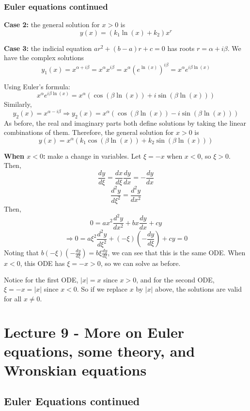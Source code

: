 \documentclass[11pt]{article}
\newcommand{\fdx}{\frac{dy}{dx}} %
\newcommand{\sdx}{\frac{d^2y}{dx^2}}
\begin{document}
\subsubsection{Euler equations continued}
	\textbf{Case 2:} the general solution for $x > 0$ is
		$$ y(x) = (k_1 \ln(x) + k_2) x^r $$

	\textbf{Case 3:} the indicial equation $ar^2 + (b-a) r + c = 0$ has roots $r = \alpha + i \beta$. We have the complex solutions
		$$ y_1 (x) = x^{\alpha + i \beta} = x^{\alpha} x^{i \beta} = x^{\alpha}(e^{\ln(x)})^{i \beta} = x^{\alpha}e^{i \beta \ln(x)} $$

	Using Euler's formula:
		$$ x^{\alpha} e^{i \beta \ln(x)} = x^{\alpha} (\cos(\beta \ln(x)) + i \sin(\beta \ln(x))) $$
	Similarly,
		$$ y_2 (x) = x^{\alpha - i \beta} \Rightarrow y_2 (x) = x^{\alpha} (\cos(\beta \ln(x)) - i \sin(\beta \ln(x))) $$
	As before, the real and imaginary parts both define solutions by taking the linear combinations of them. Therefore, the general solution for $x > 0$ is
		$$ y(x) = x^{\alpha} (k_1 \cos(\beta \ln(x)) + k_2 \sin (\beta \ln(x))) $$

	\textbf{When $x < 0$:} make a change in variables. Let $\xi = -x$ when $x < 0$, so $\xi > 0$. Then,
		$$ \frac{dy}{d\xi} = \frac{dx}{d\xi} \frac{dy}{dx} = - \fdx $$
		$$ \frac{d^2y}{d\xi^2} = \sdx $$
	Then,
		$$ 0 = ax^2\sdx + bx\fdx + cy $$
		$$ \Rightarrow 0 = a \xi^2 \frac{d^2 y}{d\xi^2} + (-\xi)(- \frac{dy}{d\xi}) + cy = 0 $$
	Noting that $b (-\xi) (- \frac{dy}{d\xi}) = b \xi \frac{dy}{d\xi}$, we can see that this is the same ODE. When $x < 0$, this ODE has $\xi = -x > 0$, so we can solve as before.

	Notice for the first ODE, $|x| = x$ since $x > 0$, and for the second ODE, $\xi = -x = |x|$ since $x < 0$. So if we replace $x$ by $|x|$ above, the solutions are valid for all $x \neq 0$.

\section{Lecture 9 - More on Euler equations, some theory, and Wronskian equations}
\subsection{Euler Equations continued}
\end{document}
